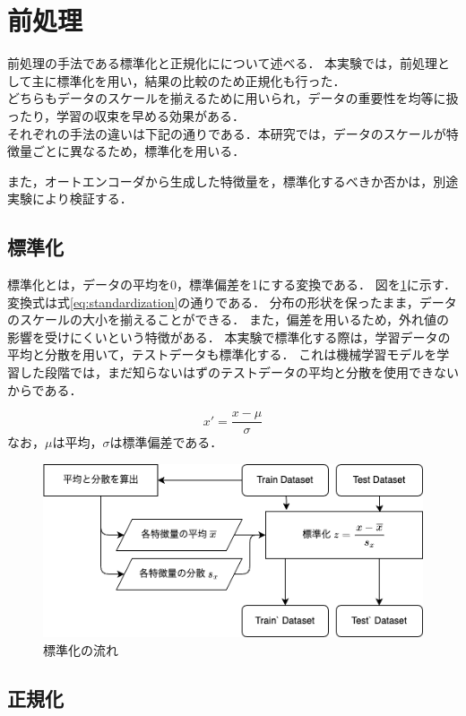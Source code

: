 \section{前処理}
前処理の手法である標準化と正規化にについて述べる．
本実験では，前処理として主に標準化を用い，結果の比較のため正規化も行った．\\
どちらもデータのスケールを揃えるために用いられ，データの重要性を均等に扱ったり，学習の収束を早める効果がある．\\
それぞれの手法の違いは下記の通りである．本研究では，データのスケールが特徴量ごとに異なるため，標準化を用いる．

また，オートエンコーダから生成した特徴量を，標準化するべきか否かは，別途実験により検証する．

\subsection{標準化}

標準化とは，データの平均を0，標準偏差を1にする変換である．
図を\ref{fig:standardization}に示す．
変換式は式\ref{eq:standardization}の通りである．
分布の形状を保ったまま，データのスケールの大小を揃えることができる．
また，偏差を用いるため，外れ値の影響を受けにくいという特徴がある．
本実験で標準化する際は，学習データの平均と分散を用いて，テストデータも標準化する．
これは機械学習モデルを学習した段階では，まだ知らないはずのテストデータの平均と分散を使用できないからである．

\begin{equation}
  \label{eq:standardization}
  x' = \frac{x - \mu}{\sigma}
\end{equation}
なお，$\mu$は平均，$\sigma$は標準偏差である．

\begin{figure}[htbp]
  \centering
  \includegraphics[width=0.6\linewidth]{figures/standardization.png}
  \caption{標準化の流れ}
  \label{fig:standardization}
\end{figure}

\subsection{正規化}

